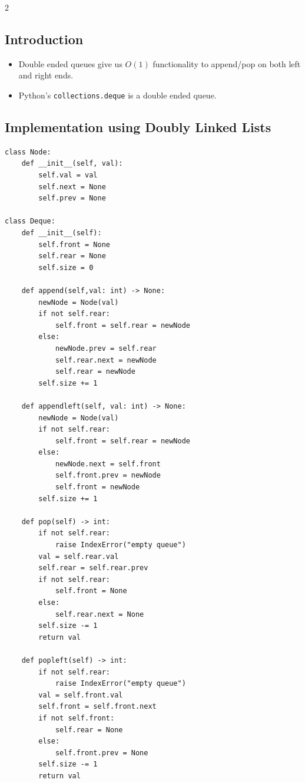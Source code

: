 \documentclass[9pt,a4paper]{extarticle}
\begin{document}
\begin{multicols}{2}
\subsection{Introduction}

\begin{itemize}
\item Double ended queues give us $O(1)$ functionality to append/pop on both left and right ends.
\item Python's \texttt{collections.\allowbreak{}deque} is a double ended queue.
\end{itemize}

\subsection{Implementation using Doubly Linked Lists}

\begin{lstlisting}
class Node:
    def __init__(self, val):
        self.val = val
        self.next = None
        self.prev = None

class Deque:
    def __init__(self):
        self.front = None
        self.rear = None
        self.size = 0

    def append(self,val: int) -> None:
        newNode = Node(val)
        if not self.rear:
            self.front = self.rear = newNode
        else:
            newNode.prev = self.rear
            self.rear.next = newNode
            self.rear = newNode
        self.size += 1

    def appendleft(self, val: int) -> None:
        newNode = Node(val)
        if not self.rear:
            self.front = self.rear = newNode
        else:
            newNode.next = self.front
            self.front.prev = newNode
            self.front = newNode
        self.size += 1

    def pop(self) -> int:
        if not self.rear:
            raise IndexError("empty queue")
        val = self.rear.val
        self.rear = self.rear.prev
        if not self.rear:
            self.front = None
        else:
            self.rear.next = None
        self.size -= 1
        return val

    def popleft(self) -> int:
        if not self.rear:
            raise IndexError("empty queue")
        val = self.front.val
        self.front = self.front.next
        if not self.front:
            self.rear = None
        else:
            self.front.prev = None
        self.size -= 1
        return val


\end{lstlisting}
\end{multicols}
\end{document}
